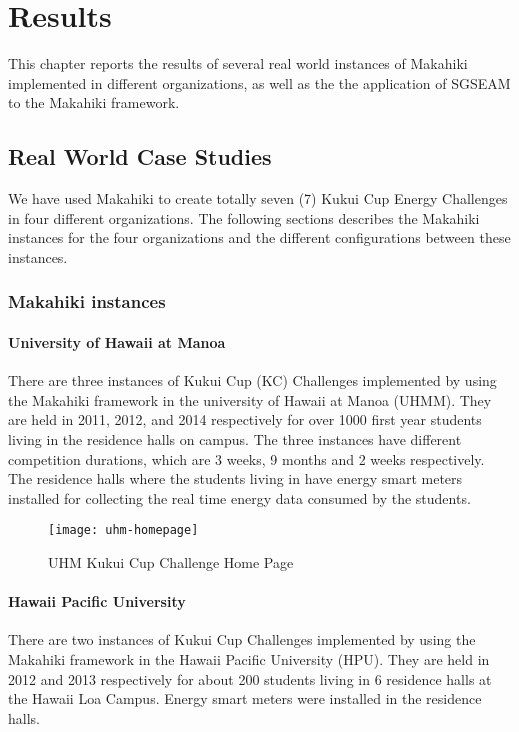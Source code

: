 \chapter{Results}
\label{cha:results}

This chapter reports the results of several real world instances of Makahiki implemented in different organizations, as well as the the application of SGSEAM to the Makahiki framework.

\section{Real World Case Studies}

We have used Makahiki to create totally seven (7) Kukui Cup Energy Challenges in four different organizations. The following sections describes the Makahiki instances for the four organizations and the different configurations between these instances.

\subsection{Makahiki instances}

\subsubsection{University of Hawaii at Manoa}

There are three instances of Kukui Cup (KC) Challenges implemented by using the Makahiki framework in the university of Hawaii at Manoa (UHMM). They are held in 2011, 2012, and 2014 respectively for over 1000 first year students living in the residence halls on campus. The three instances have different competition durations, which are 3 weeks, 9 months and 2 weeks respectively. The residence halls where the students living in have energy smart meters installed for collecting the real time energy data consumed by the students. 

\begin{figure}[ht!]
   \centering
   \texttt{[image: uhm-homepage]}
   \caption{UHM Kukui Cup Challenge Home Page}
   \label{fig:uhm-homepage}
\end{figure}

\subsubsection{Hawaii Pacific University}

There are two instances of Kukui Cup Challenges implemented by using the Makahiki framework in the Hawaii Pacific University (HPU). They are held in 2012 and 2013 respectively for about 200 students living in 6 residence halls at the Hawaii Loa Campus. Energy smart meters were installed in the residence halls.

